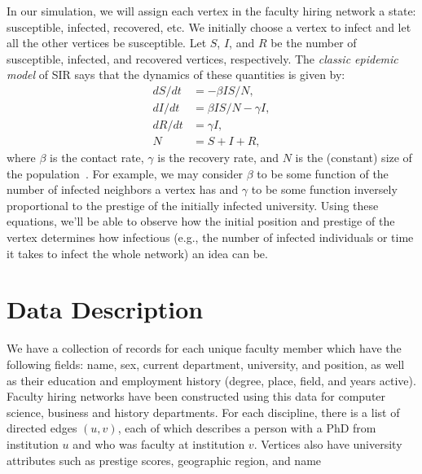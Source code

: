 \documentclass{article}
\begin{document}
In our simulation, we will assign each vertex in the faculty hiring network a
state: susceptible, infected, recovered, etc. We initially choose a vertex to
infect and let all the other vertices be susceptible. Let $S$, $I$, and $R$ be
the number of susceptible, infected, and recovered vertices, respectively. The \emph{classic epidemic model} of SIR says that the dynamics of these quantities is given by:
    \begin{align*}
        dS/dt &= -\beta IS/N,\\
        dI/dt &= \beta IS/N - \gamma I,\\
        dR/dt &= \gamma I,\\
        N &= S + I + R,
    \end{align*}
where $\beta$ is the contact rate, $\gamma$ is the recovery rate, and $N$ is the
(constant) size of the population~\cite{newman:networks,hethcote}. For example,
we may consider $\beta$ to be some function of the number of infected neighbors
a vertex has and $\gamma$ to be some function inversely proportional to the
prestige of the initially infected university. Using these equations, we'll be
able to observe how the initial position and prestige of the vertex determines how infectious (e.g., the number of infected individuals or time it takes to infect the whole network) an idea can be.


\section{Data Description}\label{proposal}

We have a collection of records for each unique faculty member which have the following fields: name, sex, current department, university, and position, as well as their education and employment history (degree, place, field, and years active). Faculty hiring networks have been constructed using this data for computer science, business and history departments. For each discipline, there is a list of directed edges $(u,v)$, each of which describes a person with a PhD from institution $u$ and who was faculty at institution $v$. Vertices also have university attributes such as prestige scores, geographic region, and name~\cite{clauset:hiring}




\end{document}
